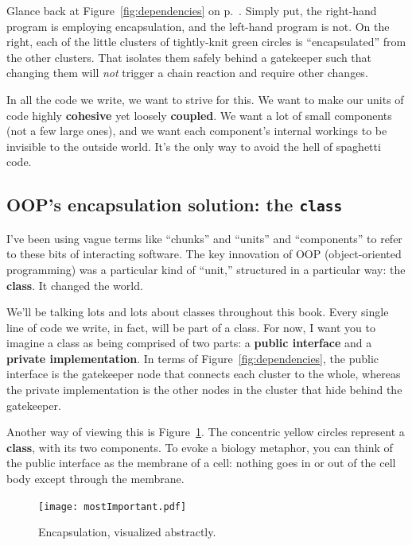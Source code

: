 Glance back at Figure~\ref{fig:dependencies} on p.~\pageref{fig:dependencies}.
Simply put, the right-hand program is employing encapsulation, and the
left-hand program is not. On the right, each of the little clusters of
tightly-knit green circles is ``encapsulated'' from the other clusters. That
isolates them safely behind a gatekeeper such that changing them will
\textit{not} trigger a chain reaction and require other changes.

In all the code we write, we want to strive for this. We want to make our
units of code highly \textbf{cohesive} yet loosely \textbf{coupled}. We want a
lot of small components (not a few large ones), and we want each component's
internal workings to be invisible to the outside world. It's the only way to
avoid the hell of spaghetti code.

\subsection{OOP's encapsulation solution: the \texttt{class}}

I've been using vague terms like ``chunks'' and ``units'' and ``components''
to refer to these bits of interacting software. The key innovation of OOP
(object-oriented programming) was a particular kind of ``unit,'' structured in
a particular way: the \textbf{class}. It changed the world.

We'll be talking lots and lots about classes throughout this book. Every
single line of code we write, in fact, will be part of a class. For now, I
want you to imagine a class as being comprised of two parts: a \textbf{public
interface} and a \textbf{private implementation}. In terms of
Figure~\ref{fig:dependencies}, the public interface is the gatekeeper node
that connects each cluster to the whole, whereas the private implementation is
the other nodes in the cluster that hide behind the gatekeeper.

Another way of viewing this is Figure~\ref{fig:mostImportant}. The concentric
yellow circles represent a \textbf{class}, with its two components. To evoke a
biology metaphor, you can think of the public interface as the membrane of a
cell: nothing goes in or out of the cell body except through the membrane.

\begin{figure}[ht]
\centering
\texttt{[image: mostImportant.pdf]}
\caption{Encapsulation, visualized abstractly.}
\label{fig:mostImportant}
\end{figure}

